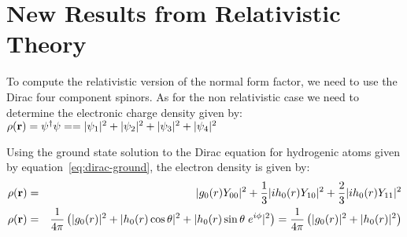 
\section{New Results from Relativistic Theory}
    To compute the relativistic version of the normal form factor, we
    need to use the Dirac four component spinors. As for the non
    relativistic case we need to determine the electronic charge
    density given by:
    \(
        \rho(\mathbf{r}) = \psi^{\dagger} \psi =
            = |\psi_1|^2 + |\psi_2|^2 + |\psi_3|^2 + |\psi_4|^2 
    \)

    Using the ground state solution to the Dirac equation for hydrogenic
    atoms given by equation~\ref{eq:dirac-ground}, the electron density
    is given by:
    \begin{eqnarray*}
        \rho(\mathbf{r}) &=&  |g_0(r) Y_{00}|^2 + 
                            \frac{1}{3} |i h_0(r) Y_{10}|^2 +
                            \frac{2}{3} |i h_0(r) Y_{11}|^2
       \\
       \rho(\mathbf{r}) &=&  \frac{1}{4\pi} \left( |g_0(r)|^2 +
                            |h_0(r) \cos \theta|^2  +
                            |h_0(r) \sin \theta \; e^{i\phi}|^2  \right)
       = \frac{1}{4\pi} 
                            \left(
                                |g_0(r)|^2 + |h_0(r)|^2
                            \right)
    \end{eqnarray*}


